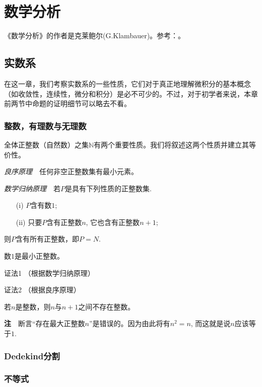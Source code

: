 \part{数学分析}
《数学分析》的作者是克莱鲍尔(G.Klambauer)。参考：\cite{MathematicalAnalysisKlambauer1981}。

\chapter{实数系}\label{ch01001}
在这一章，我们考察实数系的一些性质，它们对于真正地理解微积分的基本概念（如收敛性，连续性，微分和积分）是必不可少的。不过，对于初学者来说，本章前两节中命题的证明细节可以略去不看。

\section{整数，有理数与无理数}\label{sec0100101}
全体正整数（自然数）之集$\mathbb{N}$有两个重要性质。我们将叙述这两个性质并建立其等价性。

\emph{良序原理}\ \ 任何非空正整数集有最小元素。

\emph{数学归纳原理}\ \ 若$P$是具有下列性质的正整数集.
\begin{enumerate}
\item[(i)] $P$含有数$1$;
\item[(ii)] 只要$P$含有正整数$n$, 它也含有正整数$n+1$;
\end{enumerate}
则$P$含有所有正整数，即$P = N$.

\begin{proposition}{}{}
数$1$是最小正整数。
\end{proposition}

证法1 （根据数学归纳原理）

证法2 （根据良序原理）

\begin{corollary}{}{}
若$n$是整数，则$n$与$n+1$之间不存在整数。
\end{corollary}

\textbf{注}\ \ 断言“存在最大正整数$n$”是错误的。因为由此将有$n^2=n$, 而这就是说$n$应该等于$1$.

\section{Dedekind分割}\label{sec0100102}


\section{不等式}\label{sec0100103}

